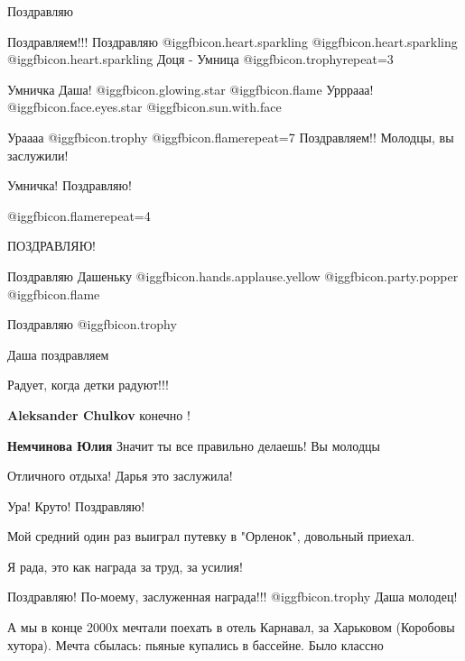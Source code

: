 \begin{itemize}
Поздравляю

Поздравляем!!!
Поздравляю  @igg{fbicon.heart.sparkling}   @igg{fbicon.heart.sparkling}   @igg{fbicon.heart.sparkling} 
Доця - Умница @igg{fbicon.trophy}{repeat=3} 

Умничка Даша!  @igg{fbicon.glowing.star}  @igg{fbicon.flame}  Урррааа! @igg{fbicon.face.eyes.star}  @igg{fbicon.sun.with.face} 

Ураааа @igg{fbicon.trophy}  @igg{fbicon.flame}{repeat=7} 
Поздравляем!! Молодцы, вы заслужили!

Умничка! Поздравляю!

 @igg{fbicon.flame}{repeat=4} 

ПОЗДРАВЛЯЮ!

Поздравляю Дашеньку @igg{fbicon.hands.applause.yellow}  @igg{fbicon.party.popper}  @igg{fbicon.flame} 

Поздравляю @igg{fbicon.trophy} 

Даша поздравляем

Радует, когда детки радуют!!!

\begin{itemize} %
\textbf{Aleksander Chulkov} конечно !

\textbf{Немчинова Юлия} Значит ты все правильно делаешь! Вы молодцы
\end{itemize} %

Отличного отдыха! Дарья это заслужила!

Ура! Круто! Поздравляю!

\begin{itemize} %
Мой средний один раз выиграл путевку в "Орленок", довольный приехал.
\end{itemize} %

Я рада, это как награда за труд, за усилия!

Поздравляю! По-моему, заслуженная награда!!! @igg{fbicon.trophy}  Даша молодец!


А мы в конце 2000х мечтали поехать в отель Карнавал, за Харьковом (Коробовы
хутора). Мечта сбылась: пьяные купались в бассейне. Было классно


\end{itemize}
